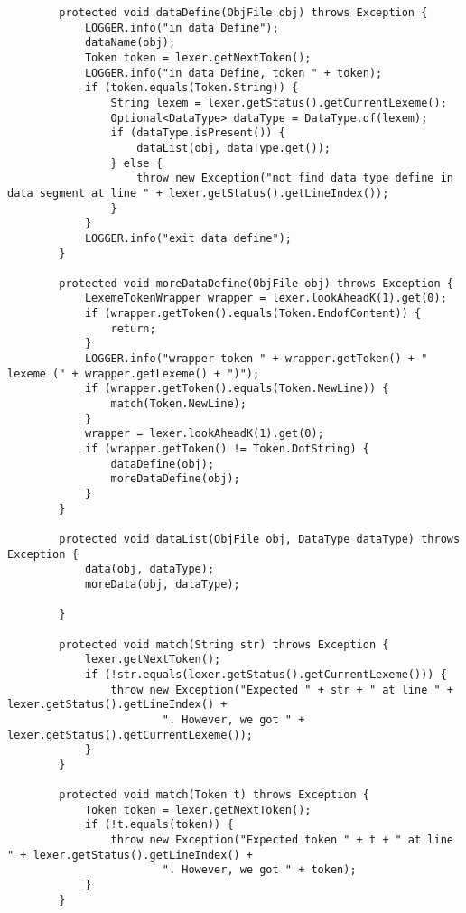 \documentclass[12pt]{extarticle}
\begin{document}
\begin{enumerate}
\begin{lstlisting}
        protected void dataDefine(ObjFile obj) throws Exception {
            LOGGER.info("in data Define");
            dataName(obj);
            Token token = lexer.getNextToken();
            LOGGER.info("in data Define, token " + token);
            if (token.equals(Token.String)) {
                String lexem = lexer.getStatus().getCurrentLexeme();
                Optional<DataType> dataType = DataType.of(lexem);
                if (dataType.isPresent()) {
                    dataList(obj, dataType.get());
                } else {
                    throw new Exception("not find data type define in data segment at line " + lexer.getStatus().getLineIndex());
                }
            }
            LOGGER.info("exit data define");
        }
    
        protected void moreDataDefine(ObjFile obj) throws Exception {
            LexemeTokenWrapper wrapper = lexer.lookAheadK(1).get(0);
            if (wrapper.getToken().equals(Token.EndofContent)) {
                return;
            }
            LOGGER.info("wrapper token " + wrapper.getToken() + " lexeme (" + wrapper.getLexeme() + ")");
            if (wrapper.getToken().equals(Token.NewLine)) {
                match(Token.NewLine);
            }
            wrapper = lexer.lookAheadK(1).get(0);
            if (wrapper.getToken() != Token.DotString) {
                dataDefine(obj);
                moreDataDefine(obj);
            }
        }
    
        protected void dataList(ObjFile obj, DataType dataType) throws Exception {
            data(obj, dataType);
            moreData(obj, dataType);
    
        }
    
        protected void match(String str) throws Exception {
            lexer.getNextToken();
            if (!str.equals(lexer.getStatus().getCurrentLexeme())) {
                throw new Exception("Expected " + str + " at line " + lexer.getStatus().getLineIndex() +
                        ". However, we got " + lexer.getStatus().getCurrentLexeme());
            }
        }
    
        protected void match(Token t) throws Exception {
            Token token = lexer.getNextToken();
            if (!t.equals(token)) {
                throw new Exception("Expected token " + t + " at line " + lexer.getStatus().getLineIndex() +
                        ". However, we got " + token);
            }
        }
    

\end{lstlisting}
\end{enumerate}
\end{document}
